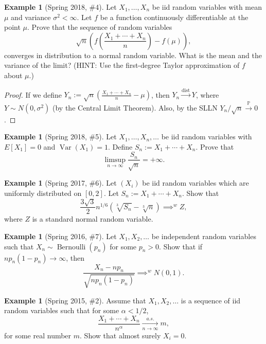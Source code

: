 \documentclass[12pt,reqno]{article}
\theoremstyle{plain}
\theoremstyle{definition}
\newtheorem{example}[theorem]{Example}
\begin{document}
\begin{example}[Spring 2018, \#4]
Let $X_1,\ldots,X_n$ be iid random variables with mean $\mu$ and 
variance $\sigma^2 < \infty$. Let $f$ be a function continuously 
differentiable at the point $\mu$. Prove that the sequence of random 
variables 
\[
\sqrt{n}\left(f\left(\frac{X_1+\cdots+X_n}{n}\right) - f(\mu)\right), 
\]
converges in distribution to a normal random variable. What is the 
mean and the variance of the limit? 
(HINT: Use the first-degree Taylor approximation of $f$ about $\mu$.)
\end{example} 
\begin{proof}
If we define $Y_n := \sqrt{n}\left(\frac{X_1+\cdots+X_n}{n} - \mu\right)$, 
then $Y_n \xrightarrow{\operatorname{dist}} Y$, where 
$Y \sim N(0, \sigma^2)$ (by the Central Limit Theorem). 
Also, by the SLLN $Y_n / \sqrt{n} \xrightarrow{\mathbb{P}} 0$. 
\end{proof} 

\begin{example}[Spring 2018, \#5]
Let $X_1,\ldots,X_n,\ldots$ be iid random variables with $E[X_1] = 0$ and 
$\operatorname{Var}(X_1) = 1$. Define $S_n := X_1+\cdots+X_n$. 
Prove that 
\[
\limsup_{n \rightarrow \infty} \frac{S_n}{\sqrt{n}} = +\infty. 
\]
\end{example} 

\begin{example}[Spring 2017, \#6]
Let $(X_i)$ be iid random variables which are uniformly distributed on 
$[0,2]$. Let $S_n := X_1+\cdots+X_n$. Show that 
\[
\frac{3\sqrt{3}}{2} n^{1/6}\left(\sqrt[3]{S_n} - \sqrt[3]{n}\right) 
     \implies^{w} Z, 
\]
where $Z$ is a standard normal random variable.  
\end{example} 

\begin{example}[Spring 2016, \#7]
Let $X_1,X_2,\ldots$ be independent random variables such that 
$X_n \sim \operatorname{Bernoulli}(p_n)$ for some $p_n > 0$. Show that if 
$np_n(1-p_n) \rightarrow \infty$, then 
\[
\frac{X_n - np_n}{\sqrt{np_n(1-p_n)}} \implies^{w} N(0, 1). 
\]
\end{example} 

\begin{example}[Spring 2015, \#2]
Assume that $X_1,X_2,\ldots$ is a sequence of iid random variables such 
that for some $\alpha < 1/2$,
\[
\frac{X_1+\cdots+X_n}{n^{\alpha}} \xrightarrow[n \rightarrow \infty]{a.s.} m, 
\]
for some real number $m$. Show that almost surely $X_i = 0$. 
\end{example} 
\end{document}
